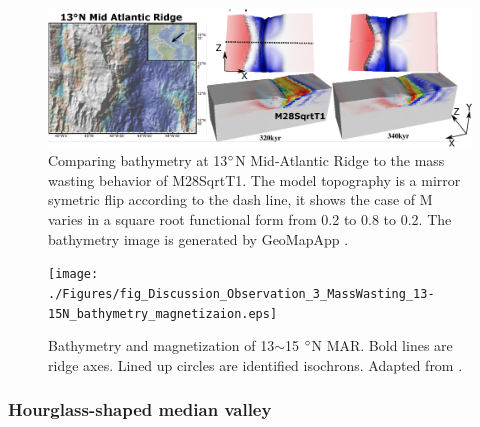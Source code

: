 \begin{figure}[h]
 \centering
  \includegraphics[width=1.0\textwidth]{./Figures/fig_Discussion_Observation_1_13N_MAR_CutBack.eps}
 \caption[Comparing bathymetry at 13$\degree$N Mid-Atlantic Ridge to the mass wasting behavior of M28SqrtT1.]{Comparing bathymetry at 13$\degree$N Mid-Atlantic Ridge to the mass wasting behavior of M28SqrtT1. The model topography is a mirror symetric flip according to the dash line, it shows the case of M varies in a square root functional form from 0.2 to 0.8 to 0.2. The bathymetry image is generated by GeoMapApp \citep{Ryan2009}.}
 \label{fig_Discussion_Observation_1_13N_MAR_CutBack}
\end{figure}

\begin{figure}[h]
 \centering
  \texttt{[image: ./Figures/fig\_Discussion\_Observation\_3\_MassWasting\_13-15N\_bathymetry\_magnetizaion.eps]}
 \caption[Bathymetry and magnetization of 13$\sim$15 $\degree$N MAR.]{Bathymetry and magnetization of 13$\sim$15 $\degree$N MAR. Bold lines are ridge axes. Lined up circles are identified isochrons. Adapted from \citep{Smith2008}.}
 \label{fig_Discussion_Observation_3_MassWasting_13-15N_bathymetry_magnetizaion}
\end{figure}
 
\subsubsection{Hourglass-shaped median valley}

